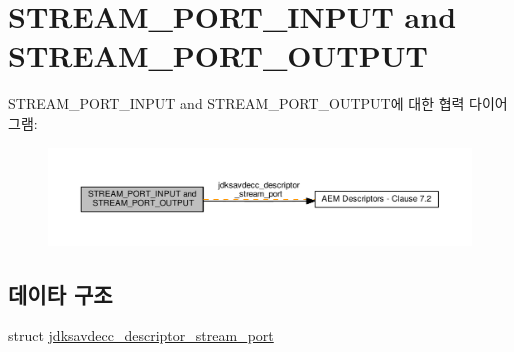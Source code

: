 \hypertarget{group__descriptor__stream__port}{}\section{S\+T\+R\+E\+A\+M\+\_\+\+P\+O\+R\+T\+\_\+\+I\+N\+P\+UT and S\+T\+R\+E\+A\+M\+\_\+\+P\+O\+R\+T\+\_\+\+O\+U\+T\+P\+UT}
\label{group__descriptor__stream__port}
S\+T\+R\+E\+A\+M\+\_\+\+P\+O\+R\+T\+\_\+\+I\+N\+P\+UT and S\+T\+R\+E\+A\+M\+\_\+\+P\+O\+R\+T\+\_\+\+O\+U\+T\+P\+U\+T에 대한 협력 다이어그램\+:
\nopagebreak
\begin{figure}[H]
\begin{center}
\leavevmode
\includegraphics[width=350pt]{group__descriptor__stream__port}
\end{center}
\end{figure}
\subsection*{데이타 구조}
\begin{DoxyCompactItemize}
\item 
struct \hyperlink{structjdksavdecc__descriptor__stream__port}{jdksavdecc\+\_\+descriptor\+\_\+stream\+\_\+port}
\end{DoxyCompactItemize}
